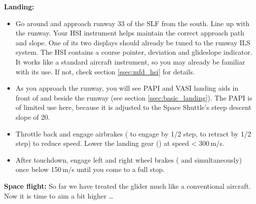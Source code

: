 \documentclass[Orbiter User Manual.tex]{subfiles}
\begin{document}
\textbf{Landing:}
\begin{itemize}
	\item Go around and approach runway 33 of the SLF from the south. Line up
		with the runway. Your HSI instrument helps maintain the correct approach
		path and slope. One of its two displays should already be tuned to the
		runway ILS system. The HSI contains a course pointer, deviation and
		glideslope indicator. It works like a standard aircraft instrument, so
		you may already be familiar with its use. If not, check section
		\ref{ssec:mfd_hsi} for details.
	\item As you approach the runway, you will see PAPI and VASI landing aids in
		front of and beside the runway (see section \ref{ssec:basic_landing}).
		The PAPI is of limited use here, because it is adjusted to the Space
		Shuttle's steep descent slope of 20\deg{}.
	\item Throttle back and engage airbrakes ( to engage by 1/2
		step,  to retract by 1/2 step) to reduce speed. Lower
		the landing gear () at speed < 300\,m/s.
	\item After touchdown, engage left and right wheel brakes (\keystroke{{,}}
		and  simultaneously) once below 150\,m/s until you come to
		a full stop.
\end{itemize}

\textbf{Space flight:}
So far we have treated the glider much like a conventional aircraft. Now it is
time to aim a bit higher \ldots
\end{document}
